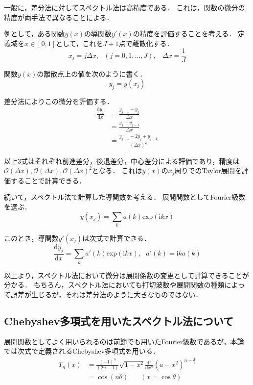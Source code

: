 \documentclass[12pt,a4paper]{jsarticle}
\begin{document}
一般に，差分法に対してスペクトル法は高精度である．
これは，関数の微分の精度が両手法で異なることによる．

例として，ある関数$y(x)$の導関数$y'(x)$の精度を評価することを考える．
定義域を$x \in [0,1]$として，これを$J+1$点で離散化する．
\begin{equation}
  x_{j} = j \Delta x, ~~~(j=0,1, \dots, J), ~~~~ \Delta x = \frac{1}{J}
\label{eq:ExampleFunction}
\end{equation}

関数$y(x)$の離散点上の値を次のように書く．
\begin{equation}
  y_{j} = y(x_{j})
\label{eq:ExampleDiscreteFunction}
\end{equation}

差分法によりこの微分を評価する．
\begin{align}
  \frac{\mathrm{d} y_{j}}{\mathrm{d} x} &= \frac{y_{j+1}-y_{j}}{\Delta x} \\
    &= \frac{y_{j}-y_{j-1}}{\Delta x} \\
    &= \frac{y_{j+1}-2y_{j} +y_{j-1}}{(\Delta x)^2}
\label{eq:ExampleDerivativeofFunction}
\end{align}

以上3式はそれぞれ前進差分，後退差分，中心差分による評価であり，精度は$\mathcal{O}(\Delta x),\mathcal{O}(\Delta x),\mathcal{O}(\Delta x)^2$となる．
これは$y(x)$の$x_{j}$周りでのTaylor展開を評価することで計算できる．

続いて，スペクトル法で計算した導関数を考える．
展開関数としてFourier級数を選ぶ．
\begin{equation}
  y(x_{j}) = \sum_{k} a(k) \mathrm{exp}(\mathrm{i}kx)
\label{eq:ExampleSpectralFunction}
\end{equation}

このとき，導関数$y'(x_{j})$は次式で計算できる．
\begin{equation}
  \frac{\mathrm{d} y_{j}}{\mathrm{d} x} = \sum_{k} a'(k) \mathrm{exp}(\mathrm{i}kx), ~~~a'(k) = \mathrm{i}k a(k)
  \label{eq:ExampleSpectralDerivaiveofFunction}
\end{equation}

以上より，スペクトル法において微分は展開係数の変更として計算できることが分かる．
もちろん，スペクトル法においても打切波数や展開関数の種類によって誤差が生じるが，それは差分法のように大きなものではない．


\subsection{Chebyshev多項式を用いたスペクトル法について}
\label{subsec:ChebyshevSpectralMehod}
展開関数としてよく用いられるのは前節でも用いたFourier級数であるが，本論では次式で定義されるChebyshev多項式を用いる．
\begin{align}
  T_{n}(x) &= \frac{(-1)^n}{(2n-1)\!\!} \sqrt{1-x^2} \frac{\mathrm{d}^n}{\mathrm{d}x^n} (a-x^2)^{n-\frac{1}{2}} \nonumber \\
           &= \cos(n\theta) ~~~~~~~~(x = \cos \theta)
\label{eq:DefofChebyshev}
\end{align}
\end{document}

